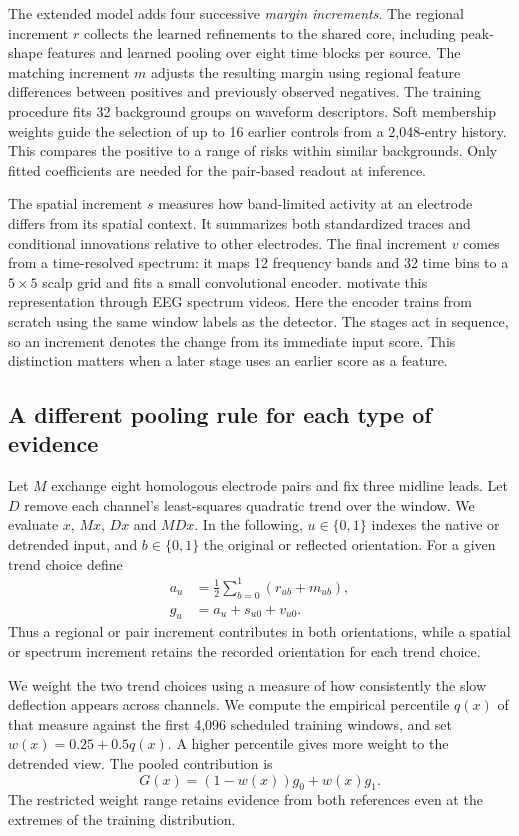 \documentclass{article}
\begin{document}
The extended model adds four successive \emph{margin increments}. The regional increment $r$ collects the learned refinements to the shared core, including peak-shape features and learned pooling over eight time blocks per source. The matching increment $m$ adjusts the resulting margin using regional feature differences between positives and previously observed negatives. The training procedure fits 32 background groups on waveform descriptors. Soft membership weights guide the selection of up to 16 earlier controls from a 2,048-entry history. This compares the positive to a range of risks within similar backgrounds. Only fitted coefficients are needed for the pair-based readout at inference.

The spatial increment $s$ measures how band-limited activity at an electrode differs from its spatial context. It summarizes both standardized traces and conditional innovations relative to other electrodes. The final increment $v$ comes from a time-resolved spectrum: it maps 12 frequency bands and 32 time bins to a $5\times5$ scalp grid and fits a small convolutional encoder. \citet{wang2026} motivate this representation through EEG spectrum videos. Here the encoder trains from scratch using the same window labels as the detector. The stages act in sequence, so an increment denotes the change from its immediate input score. This distinction matters when a later stage uses an earlier score as a feature.

\subsection{A different pooling rule for each type of evidence}
Let $M$ exchange eight homologous electrode pairs and fix three midline leads. Let $D$ remove each channel's least-squares quadratic trend over the window. We evaluate $x$, $Mx$, $Dx$ and $MDx$. In the following, $u\in\{0,1\}$ indexes the native or detrended input, and $b\in\{0,1\}$ the original or reflected orientation. For a given trend choice define
\begin{align}
a_u &= \tfrac12\sum_{b=0}^{1}(r_{ub}+m_{ub}),\\
g_u &= a_u+s_{u0}+v_{u0}.
\end{align}
Thus a regional or pair increment contributes in both orientations, while a spatial or spectrum increment retains the recorded orientation for each trend choice.

We weight the two trend choices using a measure of how consistently the slow deflection appears across channels. We compute the empirical percentile $q(x)$ of that measure against the first 4,096 scheduled training windows, and set $w(x)=0.25+0.5q(x)$. A higher percentile gives more weight to the detrended view. The pooled contribution is
\begin{equation}
G(x)=(1-w(x))g_0+w(x)g_1. \label{eq:stage}
\end{equation}
The restricted weight range retains evidence from both references even at the extremes of the training distribution.
\end{document}
